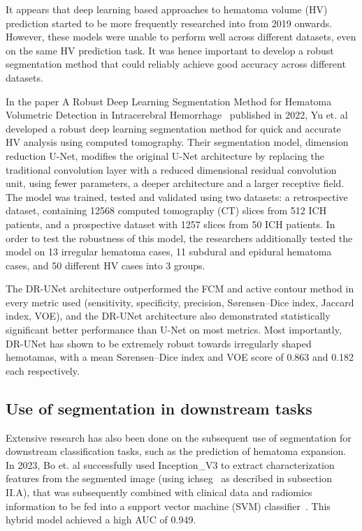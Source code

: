 \documentclass[11pt, journal, a4paper]{IEEEtran}
\begin{document}
It appears that deep learning based approaches to hematoma volume (HV) prediction started to be more frequently researched into from 2019 onwards. However, these models were unable to perform well across different datasets, even on the same HV prediction task. It was hence important to develop a robust segmentation method that could reliably achieve good accuracy across different datasets. 

In the paper A Robust Deep Learning Segmentation Method for Hematoma Volumetric Detection in Intracerebral Hemorrhage~\cite{robust_dl_segmentation} published in 2022, Yu et. al developed a robust deep learning segmentation method for quick and accurate HV analysis using computed tomography. Their segmentation model, dimension reduction U-Net, modifies the original U-Net architecture by replacing the traditional convolution layer with a reduced dimensional residual convolution unit, using fewer parameters, a deeper architecture and a larger receptive field. The model was trained, tested and validated using two datasets: a retrospective dataset, containing 12568 computed tomography (CT) slices from 512 ICH patients, and a prospective dataset with 1257 slices from 50 ICH patients. In order to test the robustness of this model, the researchers additionally tested the model on 13 irregular hematoma cases, 11 subdural and epidural hematoma cases, and 50 different HV cases into 3 groups. 

The DR-UNet architecture outperformed the FCM and active contour method in every metric used (sensitivity, specificity, precision, Sørensen–Dice index, Jaccard index, VOE), and the DR-UNet architecture also demonstrated statistically significant better performance than U-Net on most metrics. Most importantly, DR-UNet has shown to be extremely robust towards irregularly shaped hemotamas, with a mean Sørensen–Dice index and VOE score of 0.863 and 0.182 each respectively. 


\subsection{Use of segmentation in downstream tasks}
Extensive research has also been done on the subsequent use of segmentation for downstream classification tasks, such as the prediction of hematoma expansion. In 2023, Bo et. al successfully used Inception\_V3 to extract characterization features from the segmented image (using ichseg~\cite{pitchperfect} as described in subsection II.A), that was subsequently combined with clinical data and radiomics information to be fed into a support vector machine (SVM) classifier~\cite{Bo_Xiong_Huang_Liu_Chen_2023}. This hybrid model achieved a high AUC of 0.949. 
\end{document}
